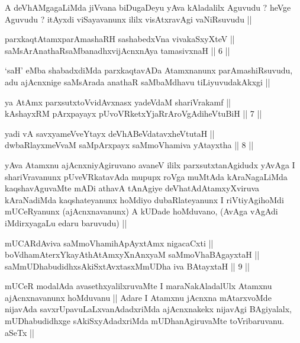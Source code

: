 \begin{artha}
A deVhAMgagaLiMda jiVvana biDugaDeyu yAva kAladalilx Aguvudu ? heVge
Aguvudu ? itAyxdi viSayavanunx ililx visAtxravAgi vaNiRsuvudu ||
\end{artha}

\begin{shl}
parxkaqtAtamxparAmashaRH sashabedxVna vivakaSxyXteV || \\
saMsArAnathaRsaMbanadhxvijAcnxnAya tamasivxnaH ||  6 ||  
\end{shl}

\begin{artha}
`saH' eMba shabadxdiMda parxkaqtavADa Atamxnanunx parAmashiRsuvudu,
adu ajAcnxnige saMsArada anathaR saMbaMdhavu tiLiyuvudakAkxgi ||
\end{artha}

\begin{shl}
ya AtAmx parxsutxtoV\s vidAvxnasx yadeVdaM shariVrakamf || \\
kAshayxRM pArxpayayx pUvoVRketxYjaRrAroVgAdiheVtuBiH ||  7 ||  
\end{shl}

\begin{shl}
yadi vA savxyameVveYtayx deVhABeVdatavxheVtutaH || \\
dwbaRlayxmeVvaM saMpArxpayx saMmoVhamiva yAtayxtha ||  8 ||  
\end{shl}

\begin{artha}
yAva Atamxnu ajAcnxniyAgiruvano avaneV ililx parxsutxtanAgidudx yAvAga
I shariVravanunx pUveVRkatavAda mupupx roVga muMtAda kAraNagaLiMda
kaqshavAguvaMte mADi athavA tAnAgiye deVhatAdAtamxyXviruva kAraNadiMda
kaqshateyanunx hoMdiyo dubaRlateyanunx I riVtiyAgihoMdi mUCeRyanunx
(ajAcnxnavanunx) A kUDade hoMduvano,  (AvAga vAgAdi iMdirxyagaLu edaru
baruvudu) || 
\end{artha}

\begin{shl}
mUCARdAviva saMmoVhamihApAyxtAmx nigacaCxti || \\
boVdhamAterxYkayAthAtAmxyXnAnxyaM saMmoVhaBAgayxtaH ||  \\
saMmUDhabudidhxsAkiSxtAvxtasxMmUDha iva BAtayxtaH ||  9 ||  
\end{shl}

\begin{artha}
mUCeR modalAda avasethxyalilxruvaMte I maraNakAladalUlx Atamxnu
ajAcnxnavanunx hoMduvanu || Adare I Atamxnu jAcnxna mAtarxvoMde
nijavAda savxrUpavuLaLxvanAdadxriMda ajAcnxnakekx nijavAgi BAgiyalalx,
mUDhabudidhxge sAkiSxyAdadxriMda mUDhanAgiruvaMte toVribaruvanu. aSeTx ||
\end{artha}

